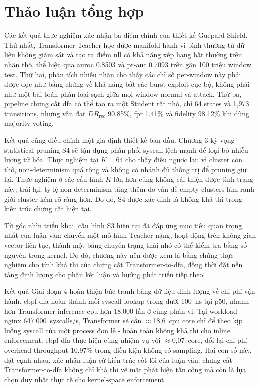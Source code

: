 \documentclass[../main.tex]{subfiles}
\begin{document}
\section{Thảo luận tổng hợp}
\label{sec:ch5_discussion}

Các kết quả thực nghiệm xác nhận ba điểm chính của thiết kế Guepard
Shield. Thứ nhất,
Transformer Teacher học được manifold hành vi bình thường từ dữ liệu
không giám sát và
tạo ra điểm \gls{nll} có khả năng xếp hạng bất thường trên nhãn thô, thể
hiện qua \gls{auroc} 0.8503
và \gls{pr-auc} 0.7093 trên gần 100 triệu window test. Thứ hai, phân tích
nhiễu nhãn cho thấy
các chỉ số per-window này phải được đọc như bằng chứng về khả năng
bắt các burst exploit
cục bộ, không phải như một bài toán phân loại sạch giữa mọi window
normal và attack.
Thứ ba, pipeline chưng cất \gls{dfa} có thể tạo ra một Student rất nhỏ, chỉ
64 states và
1,973 transitions, nhưng vẫn đạt $DR_{\text{rec}}$ 90.85\%, \gls{fpr}
1.41\% và fidelity
98.12\% khi dùng majority voting.

Kết quả cũng điều chỉnh một giả định thiết kế ban đầu. Chương 3 kỳ
vọng statistical pruning S4 sẽ tận dụng phân phối \gls{syscall} lệch mạnh
để loại bỏ nhiễu lượng tử hóa. Thực nghiệm tại $K=64$ cho thấy điều
ngược lại: vì cluster còn thô, non-determinism quá rộng và không có
nhánh đủ thống trị để pruning giữ lại. Thực nghiệm ở các cấu hình $K$
lớn hơn cũng không cải thiện được tình trạng này; trái lại, tỷ lệ
non-determinism tăng thêm do vấn đề empty clusters làm ranh giới
cluster kém rõ ràng hơn. Do đó, S4 được xác định là không khả thi
trong kiến trúc chưng cất hiện tại.

Từ góc nhìn triển khai, cấu hình S3 hiện tại đã đáp ứng mục tiêu quan
trọng nhất của luận văn: chuyển một mô hình Teacher nặng, hoạt động
trên không gian vector liên tục, thành một bảng chuyển trạng thái nhỏ
có thể kiểm tra bằng số nguyên trong kernel. Do đó, chương này nên
được xem là bằng chứng thực nghiệm cho tính khả thi của chưng cất
Transformer-to-\gls{dfa}, đồng thời đặt nền tảng định lượng cho phần kết
luận và hướng phát triển tiếp theo.

Kết quả Giai đoạn 4 hoàn thiện bức tranh bằng dữ liệu định lượng về
chi phí vận hành. \Gls{ebpf} \gls{dfa} hoàn thành mỗi \gls{syscall} lookup trong dưới
100~ns tại p50, nhanh hơn Transformer inference \gls{cpu} hơn 18.000 lần ở
cùng phân vị. Tại workload nginx 647.000~syscalls/s, Transformer sẽ
cần $\approx$18,6~\gls{cpu} core chỉ để theo kịp luồng \gls{syscall} của một
process đơn lẻ - hoàn toàn không khả thi cho inline enforcement. \Gls{ebpf}
\gls{dfa} thực hiện cùng nhiệm vụ với $\approx$0,07~core, đổi lại chi phí
overhead throughput 10,97\% trong điều kiện không có sampling. Hai con
số này, đặt cạnh nhau, xác nhận luận cứ kiến trúc cốt lõi của luận
văn: chưng cất Transformer-to-\gls{dfa} không chỉ khả thi về mặt phát hiện
tấn công mà còn là lựa chọn duy nhất thực tế cho kernel-space
enforcement.
\end{document}
